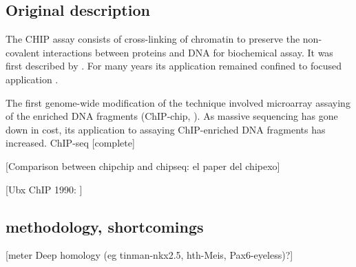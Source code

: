 \subsection{Original description}

The \ac{CHIP} assay consists of cross-linking of chromatin to preserve the non-covalent interactions between proteins and DNA for biochemical assay. It was first described by \cite{Solomon1988}. For many years its application remained confined to focused application \cite{Mardis2007}.  

The first genome-wide modification of the technique involved microarray assaying of the enriched DNA fragments (ChIP-chip, \cite{Ren2000}). As massive sequencing has gone down in cost, its application to assaying ChIP-enriched DNA fragments has increased. ChIP-seq \cite{Robertson2007} [complete]

[Comparison between chipchip and chipseq: el paper del chipexo]

[Ubx ChIP 1990: \cite{Gould1990}]

\subsection{methodology, shortcomings}




[meter Deep homology (eg tinman-nkx2.5, hth-Meis, Pax6-eyeless)?]
